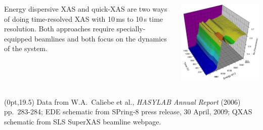 \documentclass[10pt, xcolor=x11names, compress]{beamer}
\begin{document}
\begin{frame}
  \begin{columns}
    \begin{column}{0.5\linewidth}
      \begin{overlayarea}{\linewidth}{24ex}
        Energy dispersive XAS and quick-XAS are two ways of doing
        time-resolved XAS with 10\,ms to 10\,s time resolution.  Both
        approaches require specially- equipped beamlines and both
        focus on the dynamics of the system. 
      \end{overlayarea}
    \end{column}
    \begin{column}{0.5\linewidth}
      \includegraphics[width=0.8\linewidth]{images/qxas.png}
    \end{column}
  \end{columns}

  \begin{textblock*}{0.7\linewidth}(0pt,19.5\TPVertModule)%
    \tiny%
    Data from W.A.\ Caliebe et al., \textit{HASYLAB Annual Report} (2006) pp.\
    283-284; EDE schematic from SPring-8 press release, 30 April,
    2009; QXAS schematic from SLS SuperXAS beamline webpage.
  \end{textblock*}
\end{frame}
\end{document}
